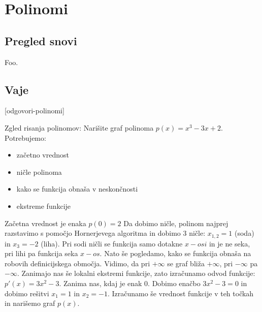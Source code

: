 \chapter{Polinomi}
\label{cha:polinomi}

\section{Pregled snovi}
\label{sec:polinomi-pregled-snovi}

Foo.

\section{Vaje}
\label{sec:polinomi-funkcije-vaje}


\def\datotekaOdgovori{odgovori-polinomi}

[\datotekaOdgovori]


\begin{vaja}
Zgled risanja polinomov:
Narišite graf polinoma $p(x)=x^3-3x+2$.
Potrebujemo:
\begin{itemize}
\item začetno vrednost
\item ničle polinoma
\item kako se funkcija obnaša v neskončnosti
\item ekstreme funkcije
\end{itemize}

Začetna vrednost je enaka $p(0)=2$
Da dobimo ničle, polinom najprej razstavimo s pomočjo Hornerjevega algoritma in dobimo 3 ničle:
$x_{1,2}=1$ (soda) in $x_3=-2$ (liha). Pri sodi ničli se funkcija samo dotakne $x-osi$ in je ne seka, pri lihi pa
funkcija seka $x-os$.
Nato še pogledamo, kako se funkcija obnaša na robovih definicijskega območja. Vidimo, da pri $+\infty$ se graf bliža $+\infty$,
pri $-\infty$ pa $-\infty$.
Zanimajo nas še lokalni ekstremi funkcije, zato izračunamo odvod funkcije: $p\prime(x)=3x^2-3$. Zanima nas, kdaj je enak $0$. Dobimo enačbo $3x^2-3=0$ in dobimo rešitvi $x_1=1$ in $x_2=-1$. Izračunamo še vrednost funkcije v teh točkah in narišemo graf $p(x)$.
\end{vaja}

